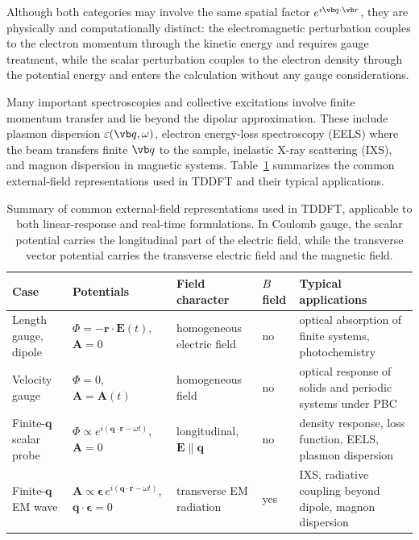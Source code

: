 Although both categories may involve the same spatial
factor $e^{\imath\vb q\cdot\vb r}$, they are physically
and computationally distinct: the electromagnetic
perturbation couples to the electron momentum through
the kinetic energy and requires gauge treatment, while
the scalar perturbation couples to the electron density
through the potential energy and enters the calculation
without any gauge considerations.


Many important spectroscopies and collective excitations
involve finite momentum transfer and lie beyond the
dipolar approximation.
These include plasmon dispersion
$\varepsilon(\vb q,\omega)$, electron energy-loss
spectroscopy (EELS) where the beam transfers finite
$\vb q$ to the sample, inelastic X-ray scattering (IXS),
and magnon dispersion in magnetic systems.
Table~\ref{tab:gauge_cases} summarizes the common
external-field representations used in TDDFT and
their typical applications.

\begin{table}[t]
\footnotesize
\caption{Summary of common external-field representations
  used in TDDFT, applicable to both linear-response and
  real-time formulations.
  In Coulomb gauge, the scalar potential carries the
  longitudinal part of the electric field, while the
  transverse vector potential carries the transverse
 electric field and the magnetic field.}
\label{tab:gauge_cases}
\centering
\begin{tabular}{p{2.5cm}p{4.2cm}p{3.2cm}p{1.4cm}p{4.0cm}}
\hline
Case
  & Potentials
  & Field character
  & $B$ field
  & Typical applications \\
\hline
Length gauge, dipole
  & $\Phi=-\mathbf r\cdot\mathbf E(t)$,
    $\mathbf A=0$
  & homogeneous electric field
  & no
  & optical absorption of finite
    systems,
    photochemistry
	\cite{yabana-bertsch-1996,jakowski-rmg-tddft-2025} \\[0.6em]
Velocity gauge
  & $\Phi=0$,
    $\mathbf A=\mathbf A(t)$
  & homogeneous field
  & no
  & optical response of solids and
    periodic systems under PBC
    \cite{Bertsch2000,Mattiat-Luber-2022,Hanasaki2023}
    \\[0.6em]
Finite-$\mathbf q$ scalar probe
  & $\Phi \propto e^{i(\mathbf q\cdot\mathbf r
    -\omega t)}$, $\mathbf A=0$
  & longitudinal,
    $\mathbf E \parallel \mathbf q$
  & no
  & density response, loss function,
    EELS, plasmon dispersion
    \cite{Weissker-2006,Weissker-2010,JCTC-2020-ebeam,Rubio-2002-eels}
    \\[0.6em]
Finite-$\mathbf q$ EM wave
  & $\mathbf A \propto
    \boldsymbol{\epsilon}\,
    e^{i(\mathbf q\cdot\mathbf r-\omega t)}$,
    $\mathbf q\cdot\boldsymbol{\epsilon}=0$
  & transverse EM radiation
  & yes
  & IXS, radiative coupling
    beyond dipole,
    magnon dispersion
	\cite{Rubio-2020-magnons,Ullrich-2025-perspective,Gross-2015-demagnetization,Gross-2020-rt-magnons} 
    \\
\hline
\end{tabular}
\end{table}

